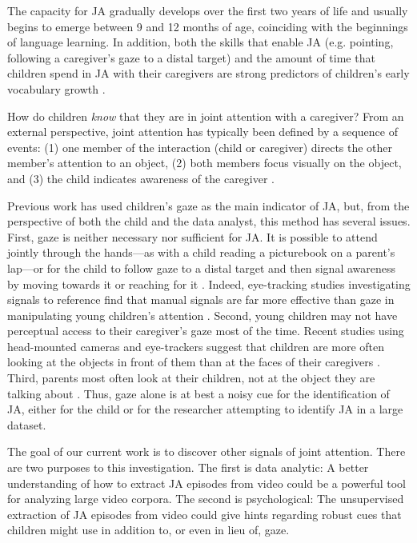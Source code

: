 \documentclass[10pt,letterpaper]{article}
\begin{document}
The capacity for JA gradually develops over the first two years of life and usually begins to emerge between 9 and 12 months of age, coinciding with the beginnings of language learning. In addition, both the skills that enable JA (e.g. pointing, following a caregiver's gaze to a distal target) and the amount of time that children spend in JA with their caregivers are strong predictors of children's early vocabulary growth \cite{carpenter1998,brooks2008}. 

How do children \emph{know} that they are in joint attention with a caregiver? From an external perspective, joint attention has typically been defined by a sequence of events: (1) one member of the interaction (child or caregiver) directs the other member’s attention to an object, (2) both members focus visually on the object, and (3) the child indicates awareness of the caregiver \cite{tomasello1986}. 

Previous work has used children's gaze as the main indicator of JA, but, from the perspective of both the child and the data analyst, this method has several issues. First, gaze is neither necessary nor sufficient for JA. It is possible to attend jointly through the hands---as with a child reading a picturebook on a parent's lap---or for the child to follow gaze to a distal target and then signal awareness by moving towards it or reaching for it \cite{yu2013}. Indeed, eye-tracking studies investigating signals to reference find that manual signals are far more effective than gaze in manipulating young children's attention \cite{yurovsky2013}. Second, young children may not have perceptual access to their caregiver's gaze most of the time. Recent studies using head-mounted cameras and eye-trackers suggest that children are more often looking at the objects in front of them than at the faces of their caregivers \cite{smith2011,franchak2011,frank2013}. Third, parents most often look at their children, not at the object they are talking about \cite{frank2013b}. Thus, gaze alone is at best a noisy cue for the identification of JA, either for the child or for the researcher attempting to identify JA in a large dataset.

The goal of our current work is to discover other signals of joint attention. There are two purposes to this investigation. The first is data analytic: A better understanding of how to extract JA episodes from video could be a powerful tool for analyzing large video corpora. The second is psychological: The unsupervised extraction of JA episodes from video could give hints regarding robust cues that children might use in addition to, or even in lieu of, gaze. 
\end{document}
